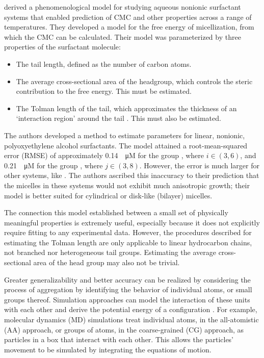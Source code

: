 \citet{puvvadaMolecularThermodynamicApproach1990} derived a phenomenological
model for studying aqueous nonionic surfactant systems that enabled prediction
of CMC and other properties across a range of temperatures. They developed a
model for the free energy of micellization, from which the CMC can be
calculated. Their model was parameterized by three properties of the surfactant
molecule:
\begin{itemize}
    \item The tail length, defined as the number of carbon atoms.
    \item The average cross-sectional area of the headgroup, which controls the
          steric contribution to the free energy. This must be estimated.
    \item The Tolman length of the tail, which approximates the thickness of an
          `interaction region' around the tail
          \cite{demiguelGibbsThermodynamicsSurface2021}. This must also be
          estimated.
\end{itemize}

The authors developed a method to estimate parameters for linear, nonionic,
polyoxyethylene alcohol surfactants. The model attained a root-mean-squared
error (RMSE) of approximately \SI{0.14}{\log \micro M} for the group
, where $i \in (3, 6)$, and \SI{0.21}{\log \micro M} for the group
, where $j \in (3, 8)$. However, the error is much larger for other
systems, like . The authors ascribed this inaccuracy to their
prediction that the micelles in these systems would not exhibit much anisotropic
growth; their model is better suited for cylindrical or disk-like (bilayer)
micelles.

The connection this model established between a small set of physically
meaningful properties is extremely useful, especially because it does not
explicitly require fitting to any experimental data. However, the procedures
described for estimating the Tolman length are only applicable to linear
hydrocarbon chains, not branched nor heterogeneous tail groups. Estimating the
average cross-sectional area of the head group may also not be trivial.

Greater generalizability and better accuracy can be realized by considering the
process of aggregation by identifying the behavior of individual atoms, or
small groups thereof. Simulation approaches can model the interaction of these
units with each other and derive the potential energy of a configuration
\cite{frenkelUnderstandingMolecularSimulation2001,joshiReviewAdvancementsCoarsegrained2021,filipeMolecularDynamicsSimulations2022}.
For example, molecular dynamics (MD) simulations treat individual atoms, in the
all-atomistic (AA) approach, or groups of atoms, in the coarse-grained (CG)
approach, as particles in a box that interact with each other. This allows the
particles' movement to be simulated by integrating the equations of motion.

